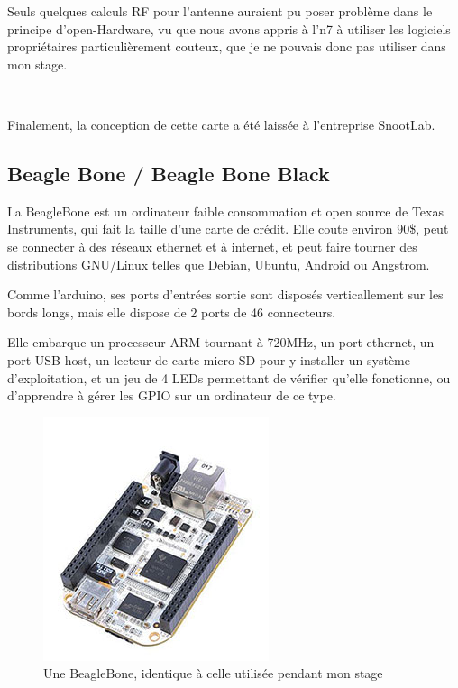 \documentclass{article}
\begin{document}
Seuls quelques calculs RF pour l’antenne auraient pu poser problème dans le principe d’open-Hardware, vu que nous avons appris à l’n7 à utiliser les logiciels propriétaires particulièrement couteux, que je ne pouvais donc pas utiliser dans mon stage.

~

Finalement, la conception de cette carte a été laissée à l’entreprise SnootLab.

\clearpage

\subsection{Beagle Bone / Beagle Bone Black}
\label{bbb}

La BeagleBone est un ordinateur faible consommation et open source de Texas Instruments, qui fait la taille d’une carte de crédit. Elle coute environ 90\$, peut se connecter à des réseaux ethernet et à internet, et peut faire tourner des distributions GNU/Linux telles que Debian, Ubuntu, Android ou Angstrom.

Comme l’arduino, ses ports d’entrées sortie sont disposés verticallement sur les bords longs, mais elle dispose de 2 ports de 46 connecteurs.

Elle embarque un processeur ARM tournant à 720MHz, un port ethernet, un port USB host, un lecteur de carte micro-SD pour y installer un système d’exploitation, et un jeu de 4 LEDs permettant de vérifier qu’elle fonctionne, ou d’apprendre à gérer les GPIO sur un ordinateur de ce type.

\begin{figure}[h!]
    \centering\includegraphics[width=\linewidth/2]{img/bb.jpg}
    \caption{Une BeagleBone, identique à celle utilisée pendant mon stage}
\end{figure}
\end{document}
